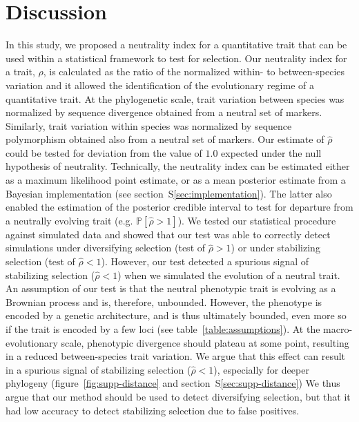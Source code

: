 \documentclass{article}
\newcommand{\proba}{\mathbb{P}}
\newcommand{\NI}{\rho}
\newcommand{\EstNI}{\widehat{\rho}}
\begin{document}
\section*{Discussion}\label{sec:discussion}

In this study, we proposed a neutrality index for a quantitative trait that can be used within a statistical framework to test for selection.
Our neutrality index for a trait, $\NI$, is calculated as the ratio of the normalized within- to between-species variation and it allowed the identification of the evolutionary regime of a quantitative trait.
At the phylogenetic scale, trait variation between species was normalized by sequence divergence obtained from a neutral set of markers.
Similarly, trait variation within species was normalized by sequence polymorphism obtained also from a neutral set of markers.
Our estimate of $\EstNI$ could be tested for deviation from the value of $1.0$ expected under the null hypothesis of neutrality.
Technically, the neutrality index can be estimated either as a maximum likelihood point estimate, or as a mean posterior estimate from a Bayesian implementation (see section~S\ref{sec:implementation}).
The latter also enabled the estimation of the posterior credible interval to test for departure from a neutrally evolving trait (e.g. $ \proba [ \EstNI > 1 ]$).
We tested our statistical procedure against simulated data and showed that our test was able to correctly detect simulations under diversifying selection (test of $\EstNI > 1$) or under stabilizing selection (test of $\EstNI < 1$).
However, our test detected a spurious signal of stabilizing selection ($\EstNI < 1$) when we simulated the evolution of a neutral trait.
An assumption of our test is that the neutral phenotypic trait is evolving as a Brownian process and is, therefore, unbounded.
However, the phenotype is encoded by a genetic architecture, and is thus ultimately bounded, even more so if the trait is encoded by a few loci (see table~\ref{table:assumptions}).
At the macro-evolutionary scale, phenotypic divergence should plateau at some point, resulting in a reduced between-species trait variation.
We argue that this effect can result in a spurious signal of stabilizing selection ($\EstNI < 1$), especially for deeper phylogeny (figure~\ref{fig:supp-distance} and section~S\ref{sec:supp-distance})
We thus argue that our method should be used to detect diversifying selection, but that it had low accuracy to detect stabilizing selection due to false positives.
\end{document}
